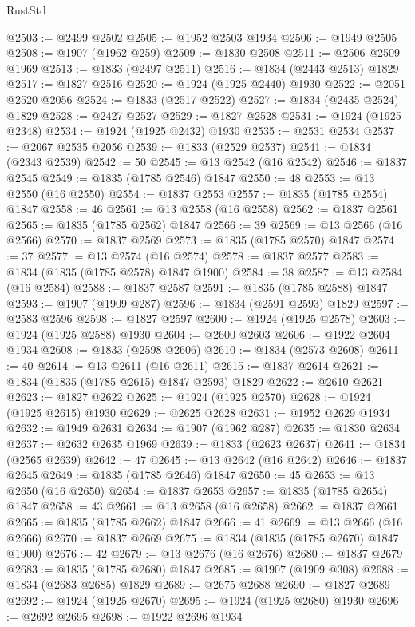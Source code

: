 \begin{lexlean}{RustStd}
\begin{coremodule}
@2503 := @2499 @2502
@2505 := @1952 @2503 @1934
@2506 := @1949 @2505
@2508 := @1907 (@1962 @259)
@2509 := @1830 @2508
@2511 := @2506 @2509 @1969
@2513 := @1833 (@2497 @2511)
@2516 := @1834 (@2443 @2513) @1829
@2517 := @1827 @2516
@2520 := @1924 (@1925 @2440) @1930
@2522 := @2051 @2520 @2056
@2524 := @1833 (@2517 @2522)
@2527 := @1834 (@2435 @2524) @1829
@2528 := @2427 @2527
@2529 := @1827 @2528
@2531 := @1924 (@1925 @2348)
@2534 := @1924 (@1925 @2432) @1930
@2535 := @2531 @2534
@2537 := @2067 @2535 @2056
@2539 := @1833 (@2529 @2537)
@2541 := @1834 (@2343 @2539)
@2542 := 50
@2545 := @13 @2542 (@16 @2542)
@2546 := @1837 @2545
@2549 := @1835 (@1785 @2546) @1847
@2550 := 48
@2553 := @13 @2550 (@16 @2550)
@2554 := @1837 @2553
@2557 := @1835 (@1785 @2554) @1847
@2558 := 46
@2561 := @13 @2558 (@16 @2558)
@2562 := @1837 @2561
@2565 := @1835 (@1785 @2562) @1847
@2566 := 39
@2569 := @13 @2566 (@16 @2566)
@2570 := @1837 @2569
@2573 := @1835 (@1785 @2570) @1847
@2574 := 37
@2577 := @13 @2574 (@16 @2574)
@2578 := @1837 @2577
@2583 := @1834 (@1835 (@1785 @2578) @1847 @1900)
@2584 := 38
@2587 := @13 @2584 (@16 @2584)
@2588 := @1837 @2587
@2591 := @1835 (@1785 @2588) @1847
@2593 := @1907 (@1909 @287)
@2596 := @1834 (@2591 @2593) @1829
@2597 := @2583 @2596
@2598 := @1827 @2597
@2600 := @1924 (@1925 @2578)
@2603 := @1924 (@1925 @2588) @1930
@2604 := @2600 @2603
@2606 := @1922 @2604 @1934
@2608 := @1833 (@2598 @2606)
@2610 := @1834 (@2573 @2608)
@2611 := 40
@2614 := @13 @2611 (@16 @2611)
@2615 := @1837 @2614
@2621 := @1834 (@1835 (@1785 @2615) @1847 @2593) @1829
@2622 := @2610 @2621
@2623 := @1827 @2622
@2625 := @1924 (@1925 @2570)
@2628 := @1924 (@1925 @2615) @1930
@2629 := @2625 @2628
@2631 := @1952 @2629 @1934
@2632 := @1949 @2631
@2634 := @1907 (@1962 @287)
@2635 := @1830 @2634
@2637 := @2632 @2635 @1969
@2639 := @1833 (@2623 @2637)
@2641 := @1834 (@2565 @2639)
@2642 := 47
@2645 := @13 @2642 (@16 @2642)
@2646 := @1837 @2645
@2649 := @1835 (@1785 @2646) @1847
@2650 := 45
@2653 := @13 @2650 (@16 @2650)
@2654 := @1837 @2653
@2657 := @1835 (@1785 @2654) @1847
@2658 := 43
@2661 := @13 @2658 (@16 @2658)
@2662 := @1837 @2661
@2665 := @1835 (@1785 @2662) @1847
@2666 := 41
@2669 := @13 @2666 (@16 @2666)
@2670 := @1837 @2669
@2675 := @1834 (@1835 (@1785 @2670) @1847 @1900)
@2676 := 42
@2679 := @13 @2676 (@16 @2676)
@2680 := @1837 @2679
@2683 := @1835 (@1785 @2680) @1847
@2685 := @1907 (@1909 @308)
@2688 := @1834 (@2683 @2685) @1829
@2689 := @2675 @2688
@2690 := @1827 @2689
@2692 := @1924 (@1925 @2670)
@2695 := @1924 (@1925 @2680) @1930
@2696 := @2692 @2695
@2698 := @1922 @2696 @1934

\end{coremodule}
\end{lexlean}
